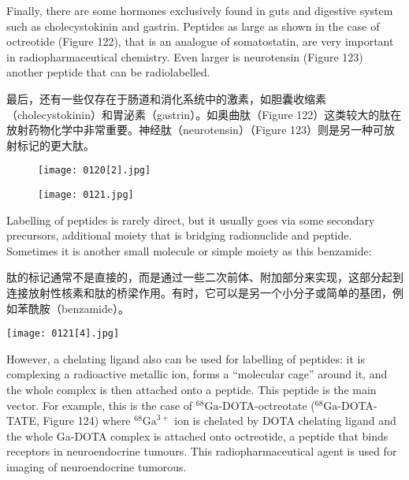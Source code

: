 \documentclass[dvipsnames, svgnames,a4paper,11pt]{article}
\begin{document}
Finally, there are some hormones exclusively found in guts and digestive system
such as cholecystokinin and gastrin. Peptides as large as shown in the case of
octreotide (Figure 122), that is an analogue of somatostatin, are very important in
radiopharmaceutical chemistry. Even larger is neurotensin (Figure 123) another
peptide that can be radiolabelled.

最后，还有一些仅存在于肠道和消化系统中的激素，如胆囊收缩素（cholecystokinin）和胃泌素（gastrin）。如奥曲肽（Figure 122）这类较大的肽在放射药物化学中非常重要。神经肽（neurotensin）（Figure 123）则是另一种可放射标记的更大肽。

\begin{figure}[h]
    \centering
    \texttt{[image: 0120[2].jpg]}
     \label{fig122}
\end{figure}

\begin{figure}[h]
    \centering
    \texttt{[image: 0121.jpg]}
     \label{fig123}
\end{figure}

Labelling of peptides is rarely direct, but it usually goes via some secondary
precursors, additional moiety that is bridging radionuclide and peptide. Sometimes it
is another small molecule or simple moiety as this benzamide:

肽的标记通常不是直接的，而是通过一些二次前体、附加部分来实现，这部分起到连接放射性核素和肽的桥梁作用。有时，它可以是另一个小分子或简单的基团，例如苯酰胺（benzamide）。

\begin{figure*}[h]
    \centering
    \texttt{[image: 0121[4].jpg]}
\end{figure*}


However, a chelating ligand also can be used for labelling of peptides: it is
complexing a radioactive metallic ion, forms a “molecular cage” around it, and the
whole complex is then attached onto a peptide. This peptide is the main vector. For
example, this is the case of ${}^{68}\mathrm{Ga}$-DOTA-octreotate (${}^{68}\mathrm{Ga}$-DOTA-TATE, Figure 124)
where ${}^{68}\mathrm{Ga}^{3+}$ ion is chelated by DOTA chelating ligand and the whole Ga-DOTA
complex is attached onto octreotide, a peptide that binds receptors in
neuroendocrine tumours. This radiopharmaceutical agent is used for imaging of
neuroendocrine tumorous.
\end{document}
